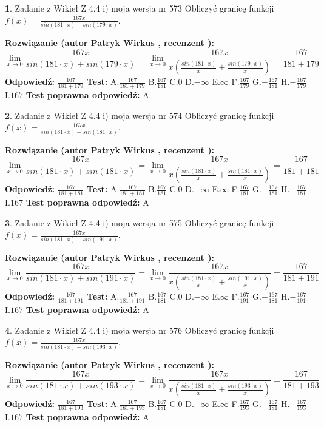 \documentclass[12pt, a4paper]{article}
\theoremstyle{definition} %
\newtheorem{zad}{}
\newcommand{\zadStart}[1]{\begin{zad}#1\newline}
\newcommand{\zadStop}{\end{zad}}
\newcommand{\rozwStart}[2]{\noindent \textbf{Rozwiązanie (autor #1 , recenzent #2): }\newline}
\newcommand{\rozwStop}{\newline}
\newcommand{\odpStart}{\noindent \textbf{Odpowiedź:}\newline}
\newcommand{\odpStop}{\newline}
\newcommand{\testStart}{\noindent \textbf{Test:}\newline}
\newcommand{\testStop}{\newline}
\newcommand{\kluczStart}{\noindent \textbf{Test poprawna odpowiedź:}\newline}
\newcommand{\kluczStop}{\newline}
\begin{document}
\zadStart{Zadanie z Wikieł Z 4.4 i) moja wersja nr 573}
Obliczyć granicę funkcji $f(x)=\frac{167x}{sin(181\cdot x) +sin(179\cdot x)}$.
\zadStop
\rozwStart{Patryk Wirkus}{}
$$\lim\limits_{x\to 0}\frac{167x}{sin(181\cdot x) +sin(179\cdot x)}=\lim\limits_{x\to 0}\frac{167x}{x(\frac{sin(181\cdot x)}{x}+\frac{sin(179\cdot x)}{x})}=\frac{167}{181+179}$$
\rozwStop
\odpStart
$\frac{167}{181+179}$
\odpStop
\testStart
A.$\frac{167}{181+179}$
B.$\frac{167}{181}$
C.$0$
D.$-\infty$
E.$\infty$
F.$\frac{167}{179}$
G.$-\frac{167}{181}$
H.$-\frac{167}{179}$
I.$167$
\testStop
\kluczStart
A
\kluczStop



\zadStart{Zadanie z Wikieł Z 4.4 i) moja wersja nr 574}
Obliczyć granicę funkcji $f(x)=\frac{167x}{sin(181\cdot x) +sin(181\cdot x)}$.
\zadStop
\rozwStart{Patryk Wirkus}{}
$$\lim\limits_{x\to 0}\frac{167x}{sin(181\cdot x) +sin(181\cdot x)}=\lim\limits_{x\to 0}\frac{167x}{x(\frac{sin(181\cdot x)}{x}+\frac{sin(181\cdot x)}{x})}=\frac{167}{181+181}$$
\rozwStop
\odpStart
$\frac{167}{181+181}$
\odpStop
\testStart
A.$\frac{167}{181+181}$
B.$\frac{167}{181}$
C.$0$
D.$-\infty$
E.$\infty$
F.$\frac{167}{181}$
G.$-\frac{167}{181}$
H.$-\frac{167}{181}$
I.$167$
\testStop
\kluczStart
A
\kluczStop



\zadStart{Zadanie z Wikieł Z 4.4 i) moja wersja nr 575}
Obliczyć granicę funkcji $f(x)=\frac{167x}{sin(181\cdot x) +sin(191\cdot x)}$.
\zadStop
\rozwStart{Patryk Wirkus}{}
$$\lim\limits_{x\to 0}\frac{167x}{sin(181\cdot x) +sin(191\cdot x)}=\lim\limits_{x\to 0}\frac{167x}{x(\frac{sin(181\cdot x)}{x}+\frac{sin(191\cdot x)}{x})}=\frac{167}{181+191}$$
\rozwStop
\odpStart
$\frac{167}{181+191}$
\odpStop
\testStart
A.$\frac{167}{181+191}$
B.$\frac{167}{181}$
C.$0$
D.$-\infty$
E.$\infty$
F.$\frac{167}{191}$
G.$-\frac{167}{181}$
H.$-\frac{167}{191}$
I.$167$
\testStop
\kluczStart
A
\kluczStop



\zadStart{Zadanie z Wikieł Z 4.4 i) moja wersja nr 576}
Obliczyć granicę funkcji $f(x)=\frac{167x}{sin(181\cdot x) +sin(193\cdot x)}$.
\zadStop
\rozwStart{Patryk Wirkus}{}
$$\lim\limits_{x\to 0}\frac{167x}{sin(181\cdot x) +sin(193\cdot x)}=\lim\limits_{x\to 0}\frac{167x}{x(\frac{sin(181\cdot x)}{x}+\frac{sin(193\cdot x)}{x})}=\frac{167}{181+193}$$
\rozwStop
\odpStart
$\frac{167}{181+193}$
\odpStop
\testStart
A.$\frac{167}{181+193}$
B.$\frac{167}{181}$
C.$0$
D.$-\infty$
E.$\infty$
F.$\frac{167}{193}$
G.$-\frac{167}{181}$
H.$-\frac{167}{193}$
I.$167$
\testStop
\kluczStart
A
\kluczStop
\end{document}

